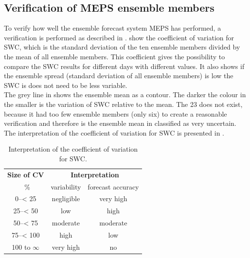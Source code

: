 \subsection{Verification of MEPS ensemble members}\label{sec:variation}

To verify how well the ensemble forecast system MEPS has performed, a verification is performed as described in .  show the coefficient of variation for SWC, which is the standard deviation of the ten ensemble members divided by the mean of all ensemble members. This coefficient gives the possibility to compare the SWC results for different days with different values. It also shows if the ensemble spread (standard deviation of all ensemble members) is low the SWC is does not need to be less variable.
\\
The grey line in  shows the ensemble mean as a contour. The darker the colour in  the smaller is the variation of SWC relative to the mean. The \SI{23}{\dec} does not exist, because it had too few ensemble members (only six) to create a reasonable verification and therefore is the ensemble mean in  classified as very uncertain. The interpretation of the coefficient of variation for SWC is presented in .
\begin{table}[t!]
	\begin{center}
		\caption{Interpretation of the coefficient of variation for SWC.} \label{tab:verification}
		\begin{tabular}{c|c|c}
			\hline\hline
			\textbf{Size of CV} & \multicolumn{2}{c}{\textbf{Interpretation}} \\ 
			\SI{}{\percent} & variability & forecast accuracy \\ \hline \hline 
			\numrange{0}{< 25} & negligible & very high  \\ \hline
			\numrange{25}{< 50} & low & high \\ \hline
			\numrange{50}{< 75} & moderate & moderate \\ \hline
			\numrange{75}{< 100} & high & low \\ \hline
			\num{100} to $\infty$ & very high & no  \\ \hline \hline
		\end{tabular}
	\end{center}
\end{table}
